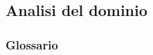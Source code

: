 \documentclass[a4paper]{article}
\begin{document}
\begin{itemize}
	
	
	
	
	
\end{itemize}

\newpage

\subsection{Analisi del dominio}

\subsubsection{Glossario}
\end{document}
